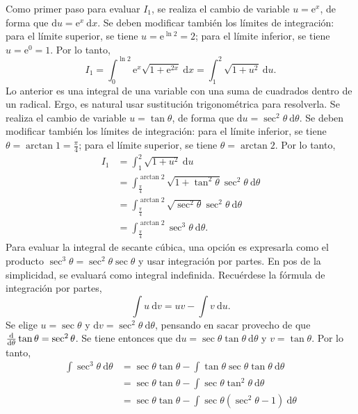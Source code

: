 \documentclass{fmbvecto}
\begin{document}
\begin{problema}
    Como primer paso para evaluar \(I_1\), se realiza el cambio de variable \(u = \mathrm{e}^{x}\), de forma que \(\mathrm{d}u = \mathrm{e}^{x} \: \mathrm{d}x\). Se deben modificar también los límites de integración: para el límite superior, se tiene \(u = \mathrm{e}^{\ln 2} = 2\); para el límite inferior, se tiene \(u = \mathrm{e}^{0} = 1\). Por lo tanto,
    \[ I_1 = \int_{0}^{\ln 2} \mathrm{e}^x \sqrt{1 + \mathrm{e}^{2x}} \: \mathrm{d}x = \int_{1}^{2} \sqrt{1 + u^2} \: \mathrm{d}u. \]
    Lo anterior es una integral de una variable con una suma de cuadrados dentro de un radical. Ergo, es natural usar sustitución trigonométrica para resolverla. Se realiza el cambio de variable \(u = \tan \theta\), de forma que \(\mathrm{d}u = \sec^2 \theta \: \mathrm{d}\theta\). Se deben modificar también los límites de integración: para el límite inferior, se tiene \(\theta = \arctan 1 = \frac{\pi}{4}\); para el límite superior, se tiene \(\theta = \arctan 2\). Por lo tanto,
    \begin{align*}
        I_1 &= \int_{1}^{2} \sqrt{1 + u^2} \: \mathrm{d}u \\
        &= \int_{\frac{\pi}{4}}^{\arctan 2} \sqrt{1 + \tan^2 \theta} \sec^2 \theta \: \mathrm{d}\theta \\
        &= \int_{\frac{\pi}{4}}^{\arctan 2} \sqrt{\sec^2 \theta} \sec^2 \theta \: \mathrm{d}\theta \\
        &= \int_{\frac{\pi}{4}}^{\arctan 2} \sec^3 \theta \: \mathrm{d}\theta.
    \end{align*}
    Para evaluar la integral de secante cúbica, una opción es expresarla como el producto \(\sec^3 \theta = \sec^2 \theta \sec \theta\) y usar integración por partes. En pos de la simplicidad, se evaluará como integral indefinida. Recuérdese la fórmula de integración por partes,
    \[ \int u \: \mathrm{d}v = uv - \int v \: \mathrm{d}u. \]
    Se elige \(u = \sec \theta\) y \(\mathrm{d}v = \sec^2 \theta \: \mathrm{d}\theta\), pensando en sacar provecho de que \(\der[][\theta] \tan \theta = \sec^2 \theta\). Se tiene entonces que \(\mathrm{d}u = \sec \theta \tan \theta \: \mathrm{d}\theta\) y \(v = \tan \theta\). Por lo tanto,
    \begin{align*}
        \int \sec^3 \theta \: \mathrm{d}\theta &= \sec \theta \tan \theta  - \int \tan \theta \sec \theta \tan \theta \: \mathrm{d}\theta \\
        &=  \sec \theta \tan \theta  - \int \sec \theta \tan^2 \theta \: \mathrm{d}\theta \\
        &=  \sec \theta \tan \theta  - \int \sec \theta (\sec^2 \theta - 1)\: \mathrm{d}\theta \\

\end{align*}
\end{problema}
\end{document}
